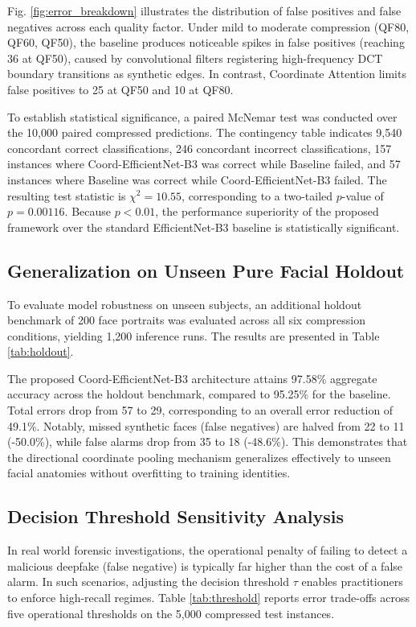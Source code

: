 \documentclass[conference]{IEEEtran}
\begin{document}
Fig. \ref{fig:error_breakdown} illustrates the distribution of false positives and false negatives across each quality factor. Under mild to moderate compression (QF80, QF60, QF50), the baseline produces noticeable spikes in false positives (reaching 36 at QF50), caused by convolutional filters registering high-frequency DCT boundary transitions as synthetic edges. In contrast, Coordinate Attention limits false positives to 25 at QF50 and 10 at QF80.

To establish statistical significance, a paired McNemar test was conducted over the 10,000 paired compressed predictions. The contingency table indicates 9,540 concordant correct classifications, 246 concordant incorrect classifications, 157 instances where Coord-EfficientNet-B3 was correct while Baseline failed, and 57 instances where Baseline was correct while Coord-EfficientNet-B3 failed. The resulting test statistic is $\chi^2 = 10.55$, corresponding to a two-tailed $p$-value of $p = 0.00116$. Because $p < 0.01$, the performance superiority of the proposed framework over the standard EfficientNet-B3 baseline is statistically significant.

\subsection{Generalization on Unseen Pure Facial Holdout}
To evaluate model robustness on unseen subjects, an additional holdout benchmark of 200 face portraits was evaluated across all six compression conditions, yielding 1,200 inference runs. The results are presented in Table \ref{tab:holdout}.

The proposed Coord-EfficientNet-B3 architecture attains 97.58\% aggregate accuracy across the holdout benchmark, compared to 95.25\% for the baseline. Total errors drop from 57 to 29, corresponding to an overall error reduction of 49.1\%. Notably, missed synthetic faces (false negatives) are halved from 22 to 11 (-50.0\%), while false alarms drop from 35 to 18 (-48.6\%). This demonstrates that the directional coordinate pooling mechanism generalizes effectively to unseen facial anatomies without overfitting to training identities.

\subsection{Decision Threshold Sensitivity Analysis}
In real world forensic investigations, the operational penalty of failing to detect a malicious deepfake (false negative) is typically far higher than the cost of a false alarm. In such scenarios, adjusting the decision threshold $\tau$ enables practitioners to enforce high-recall regimes. Table \ref{tab:threshold} reports error trade-offs across five operational thresholds on the 5,000 compressed test instances.
\end{document}
